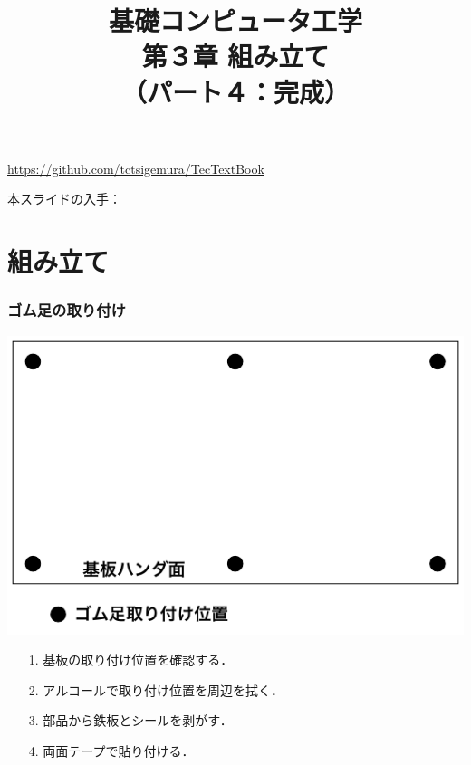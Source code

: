 \documentclass[handout]{beamer}        %
\begin{document}
\title{基礎コンピュータ工学\\第３章 組み立て\\
       （パート４：完成）}
\date{}

\begin{frame}
  \titlepage
  \centerline{\url{https://github.com/tctsigemura/TecTextBook}}
  \vfill
  \centerline{本スライドの入手：
    }
\end{frame}


\section{組み立て}
\begin{frame}
  \frametitle{ゴム足の取り付け}
  \vfill
  \centerline{\includegraphics[scale=0.7]{../Tikz/asi.pdf}}
  \vfill
  \begin{enumerate}
    \item[1.] 基板の取り付け位置を確認する．
    \item[2.] アルコールで取り付け位置を周辺を拭く．
    \item[3.] 部品から鉄板とシールを剥がす．
    \item[4.] 両面テープで貼り付ける．
  \end{enumerate}
  \vfill
\end{frame}
\end{document}
